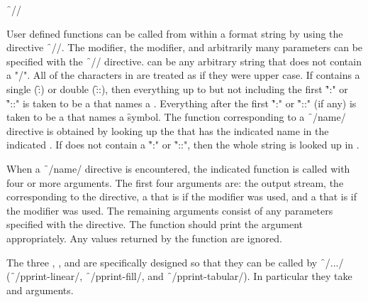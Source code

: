 \f{~//}

User defined functions can be called from within a format
string by using the directive \f{~//}.
The  modifier, the  modifier, and arbitrarily many parameters 
can be specified with the \f{~//} directive.
 can be any arbitrary string that does not contain a "/".
All of the characters in  are treated as if they were upper case.
If  contains a single  (\f{:}) or double  (\f{::}),
then everything up to but not including the first \f{":"} or \f{"::"}
is taken to be a  that names a .
Everything after the first \f{":"} or \f{"::"} (if any) is taken to be a 
 that names a \f{symbol}.  The function corresponding to a 
\f{~/name/} directive is obtained by looking up the 
that has the indicated name in the indicated .
If  does not contain a \f{":"} or \f{"::"},
then the whole  string is looked up in . 

When a \f{~/name/} directive is encountered,
the indicated function is called with four or more arguments.
The first four arguments are:
     the output stream,
     the  corresponding to the directive,
     a  that is  if the  modifier was used,
 and a  that is  if the  modifier was used.
The remaining arguments consist of any parameters specified with the directive.
The function should print the argument appropriately.
Any values returned by the function are ignored.
 
The three  
      ,
      ,
  and 
are specifically designed so that they can be called by \f{~/.../}
(\ie \f{~/pprint-linear/}, \f{~/pprint-fill/}, and \f{~/pprint-tabular/}).
In particular they take  and  arguments.


\endsubsubsection%

\endsubsection%



